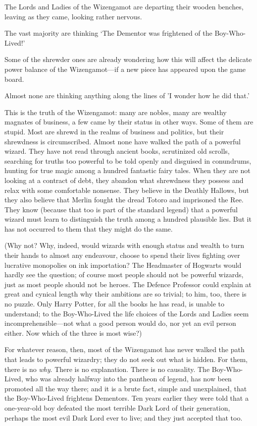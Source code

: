 \later

The Lords and Ladies of the Wizengamot are departing their wooden benches, leaving as they came, looking rather nervous.

The vast majority are thinking ‘The Dementor was frightened of the Boy-Who-Lived!’

Some of the shrewder ones are already wondering how this will affect the delicate power balance of the Wizengamot—if a new piece has appeared upon the game board.

Almost none are thinking anything along the lines of ’I wonder how he did that.’

This is the truth of the Wizengamot: many are nobles, many are wealthy magnates of business, a few came by their status in other ways. Some of them are stupid. Most are shrewd in the realms of business and politics, but their shrewdness is circumscribed. Almost none have walked the path of a powerful wizard. They have not read through ancient books, scrutinized old scrolls, searching for truths too powerful to be told openly and disguised in conundrums, hunting for true magic among a hundred fantastic fairy tales. When they are not looking at a contract of debt, they abandon what shrewdness they possess and relax with some comfortable nonsense. They believe in the Deathly Hallows, but they also believe that Merlin fought the dread Totoro and imprisoned the Ree. They know (because that too is part of the standard legend) that a powerful wizard must learn to distinguish the truth among a hundred plausible lies. But it has not occurred to them that they might do the same.

(Why not? Why, indeed, would wizards with enough status and wealth to turn their hands to almost any endeavour, choose to spend their lives fighting over lucrative monopolies on ink importation? The Headmaster of Hogwarts would hardly see the question; of course most people should not be powerful wizards, just as most people should not be heroes. The Defence Professor could explain at great and cynical length why their ambitions are so trivial; to him, too, there is no puzzle. Only Harry Potter, for all the books he has read, is unable to understand; to the Boy-Who-Lived the life choices of the Lords and Ladies seem incomprehensible—not what a good person would do, nor yet an evil person either. Now which of the three is most wise?)

For whatever reason, then, most of the Wizengamot has never walked the path that leads to powerful wizardry; they do not seek out what is hidden. For them, there is no \emph{why}. There is no explanation. There is no causality. The Boy-Who-Lived, who was already halfway into the pantheon of legend, has now been promoted all the way there; and it is a brute fact, simple and unexplained, that the Boy-Who-Lived frightens Dementors. Ten years earlier they were told that a one-year-old boy defeated the most terrible Dark Lord of their generation, perhaps the most evil Dark Lord ever to live; and they just accepted that too.

